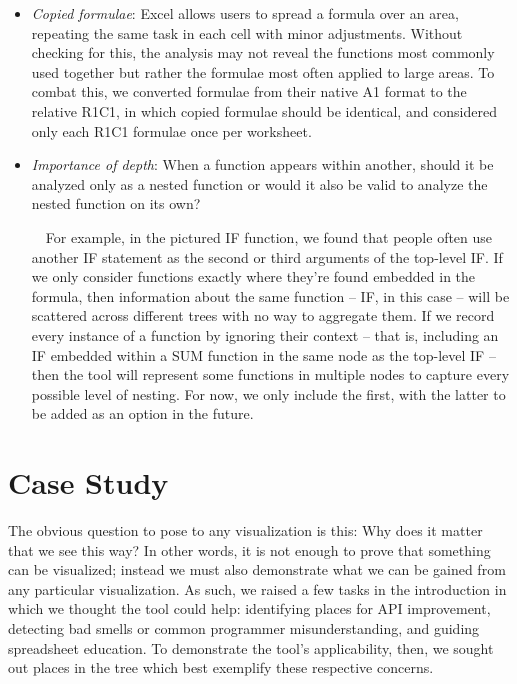 \documentclass[conference]{IEEEtran}
\begin{document}
\begin{itemize}
		\item \textit{Copied formulae}: Excel allows users to spread a
		formula over an area, repeating the same task in each cell with minor
		adjustments. Without checking for this, the analysis may not reveal the
		functions most commonly used together but rather the formulae most often
		applied to large areas. To combat this, we converted formulae from their native
		A1 format to the relative R1C1, in which copied formulae should be identical,
		and considered only each R1C1 formulae once per worksheet. 
		
		\item \textit{Importance of depth}: When a function appears within another, should it
		be analyzed only as a nested function or would it also be valid to analyze the
		nested function on its own? \par 
		
		\ \ For example, in the pictured IF function, we found that people often use
		another IF statement as the second or third arguments of the top-level IF. If
		we only consider functions exactly where they're found embedded in the
		formula, then information about the same function -- IF, in this case -- will
		be scattered across different trees with no way to aggregate them. If we
		record every instance of a function by ignoring their context -- that is,
		including an IF embedded within a SUM function in the same node as the
		top-level IF -- then the tool will represent some functions in multiple nodes
		to capture every possible level of nesting. For now, we only include the first,
		with the latter to be added as an option in the future.
		
	\end{itemize}
	
	\section{Case Study} The obvious question to pose to any visualization is this:
	Why does it matter that we see this way? In other words, it is not enough to
	prove that something can be visualized; instead we must also demonstrate what
	we can be gained from any particular visualization. As such, we raised a few
	tasks in the introduction in which we thought the tool could help: identifying
	places for API improvement, detecting bad smells or common programmer
	misunderstanding, and guiding spreadsheet education. To demonstrate the tool's
	applicability, then, we sought out places in the tree which best exemplify
	these respective concerns.
	
\end{document}
